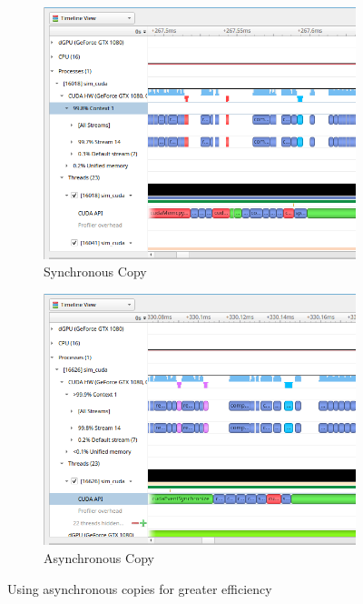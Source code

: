 \begin{figure}
    \centering
    \begin{subfigure}{0.49\linewidth}%
        \includegraphics[width=\linewidth]{Ch48Implementation/figures/memcpy_sync.png}%
        \caption{Synchronous Copy}%
    \end{subfigure}%
    \begin{subfigure}{0.49\linewidth}%
        \includegraphics[width=\linewidth]{Ch48Implementation/figures/memcpy_async.png}%
        \caption{Asynchronous Copy}%
    \end{subfigure}
    \caption{Using asynchronous copies for greater efficiency}
    \label{fig:async_copy}
\end{figure}

